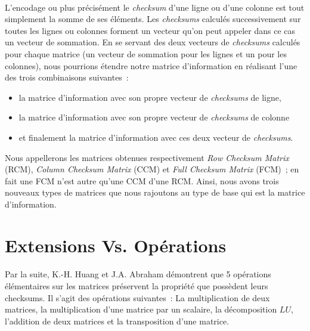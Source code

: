 \documentclass[a4paper,10pt]{report}
\begin{document}
\paragraph*{}
L’encodage ou plus précisément le \textit{checksum} d’une ligne ou d’une colonne est tout simplement la somme de ses éléments. 
Les \textit{checksums} calculés successivement sur toutes les lignes ou colonnes forment un vecteur qu’on peut appeler 
dans ce cas un vecteur de sommation.\newline
En se servant des deux vecteurs de \textit{checksums} calculés pour chaque matrice (un vecteur de sommation pour les lignes 
et un pour les colonnes), nous pourrions étendre notre matrice d’information en réalisant l’une des trois combinaisons 
suivantes : 
\begin{itemize}
 \item la matrice d’information avec son propre vecteur de \textit{checksums} de ligne,
 \item la matrice d’information avec son propre vecteur de \textit{checksums} de colonne
 \item et finalement la matrice d’information avec ces deux vecteur de \textit{checksums}.
\end{itemize}
Nous appellerons les matrices obtenues respectivement \textit{Row Checksum Matrix} (RCM), \textit{Column Checksum Matrix} (CCM) 
et \textit{Full Checksum Matrix} (FCM) ; en fait une FCM n’est autre qu’une CCM d’une RCM.
\newline
Ainsi, nous avons trois nouveaux types de matrices que nous rajoutons au type de base qui est la matrice d’information.

\section{Extensions Vs. Opérations}
\paragraph*{}
Par la suite, K.-H. Huang et J.A. Abraham démontrent que 5 opérations élémentaires sur les matrices préservent 
la propriété que possèdent leurs checksums. Il s’agit des opérations suivantes : \newline
La multiplication de deux matrices, la multiplication d’une matrice par un scalaire, la décomposition $LU$, 
l’addition de deux matrices et la transposition d’une matrice.
\end{document}
